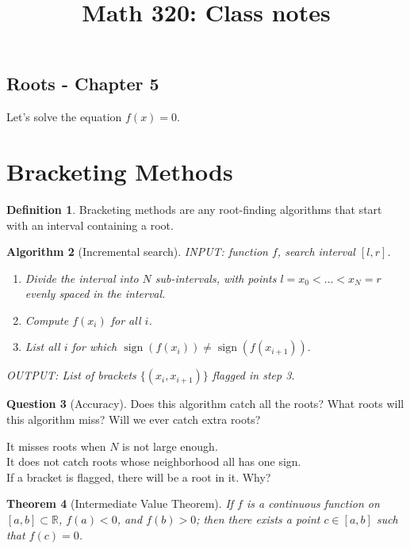 \documentclass[12pt]{amsart}
\DeclareMathOperator{\sign}{sign}
\newtheorem{thm}{Theorem}[section]   %
\newtheorem{alg}[thm]{Algorithm}   %
\theoremstyle{definition}
\newtheorem{defn}[thm]{Definition}   %
\newtheorem{question}[thm]{Question}
\newcommand{\RR}{\ensuremath{\mathbb{R}}}
\begin{document}
\title{Math 320: Class notes}
\maketitle


\subsection{Roots - Chapter 5}

Let's solve the equation $f(x) = 0$.

\section{Bracketing Methods}

\begin{defn}
Bracketing methods are any root-finding algorithms that
start with an interval containing a root.
\end{defn}

\begin{alg}[Incremental search] INPUT: function $f$, search interval $[l,r]$.
\begin{enumerate}
\item Divide the interval into $N$ sub-intervals, with points
$l = x_0 < \ldots < x_N = r$ evenly spaced in the interval.
\item Compute $f(x_i)$ for all $i$.
\item List all $i$ for which $\sign(f(x_i)) \neq \sign(f(x_{i+1})).$
\end{enumerate}
OUTPUT: List of brackets $\{(x_i,x_{i+1})\}$ flagged in step 3.

\end{alg}


\begin{question}[Accuracy]
Does this algorithm catch all the roots? 
What roots will this algorithm miss? Will we ever
catch extra roots?
\end{question}
It misses roots when $N$ is not large enough.\\
It does not catch roots whose neighborhood all has
one sign.\\
If a bracket is flagged, there will be a root in it. Why?

\begin{thm}[Intermediate Value Theorem] If $f$ is a continuous
function on $[a,b] \subset \RR$, 
$f(a) < 0$, and $f(b) > 0$; then there exists
a point $c \in [a,b]$ such that $f(c) = 0$.
\end{thm}
\end{document}
